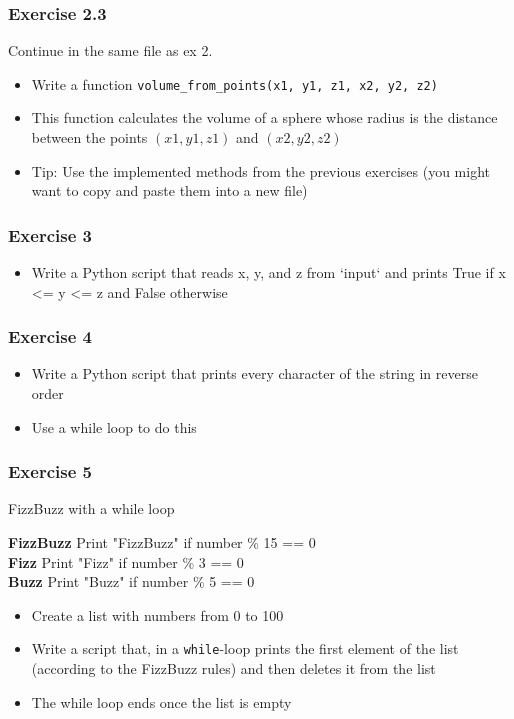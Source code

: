 \documentclass[10pt, a4paper]{beamer} %
\begin{document}
{\begin{frame}[c, fragile]\frametitle{Exercise 2.3}
	Continue in the same file as ex 2.
	\begin{itemize}
		\item Write a function \texttt{volume\_from\_points(x1, y1, z1, x2, y2, z2)}
		\item This function calculates the volume of a sphere whose radius is the distance between the points $(x1, y1, z1)$ and $(x2, y2, z2)$
		\item Tip: Use the implemented methods from the previous exercises (you might want to copy and paste them into a new file)
	\end{itemize}

\end{frame}

\begin{frame}[c, fragile]\frametitle{Exercise 3}
	\begin{itemize}
		\item Write a Python script that reads x, y, and z from `input` and prints True if x <= y <=
		      z and False otherwise
	\end{itemize}

\end{frame}

\begin{frame}[c, fragile]\frametitle{Exercise 4}

	\begin{itemize}
		\item Write a Python script that prints every character of the string in reverse order
		\item Use a while loop to do this
	\end{itemize}
\end{frame}

\begin{frame}[c, fragile]\frametitle{Exercise 5}
	FizzBuzz with a while loop

	\textbf{FizzBuzz} Print "FizzBuzz" if number \% 15 == 0\\
	\textbf{Fizz} Print "Fizz" if number \% 3 == 0\\
	\textbf{Buzz} Print "Buzz" if number \% 5 == 0

	\begin{itemize}
		\item Create a list with numbers from 0 to 100
		\item Write a script that, in a \texttt{while}-loop prints the first element of the list (according to the FizzBuzz rules) and then deletes it from the list
		\item The while loop ends once the list is empty
	\end{itemize}
\end{frame}


}
\end{document}
